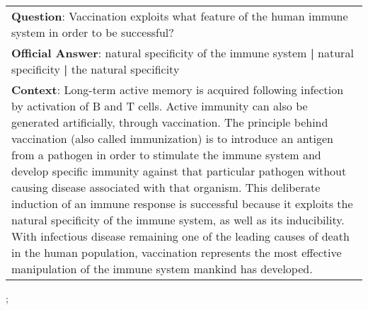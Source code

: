 \begin{figure*}[ht]
{\begin{tabular}{p{}}
            \textbf{Question}: Vaccination exploits what feature of the human immune system in order to be successful?                                                                                                                                                                                                                                                                                                                                                                                                                                                                                                                                                                                                                                                                                                            \\
            \textbf{Official Answer}: natural specificity of the immune system \textbf{|} natural specificity \textbf{|} the natural specificity                                                                                                                                                                                                                                                                                                                                                                                                                                                                                                                                                                                                                                                                                  \\
            \textbf{Context}: Long-term active memory is acquired following infection by activation of B and T cells. Active immunity can also be generated artificially, through vaccination. The principle behind vaccination (also called immunization) is to introduce an antigen from a pathogen in order to stimulate the immune system and develop specific immunity against that particular pathogen without causing disease associated with that organism. This deliberate induction of an immune response is successful because it exploits the natural specificity of the immune system, as well as its inducibility. With infectious disease remaining one of the leading causes of death in the human population, vaccination represents the most effective manipulation of the immune system mankind has developed. \\
        \end{tabular}
    };
    \label{fig:ex-5729ffda1d046914007796b2}
\end{figure*}

